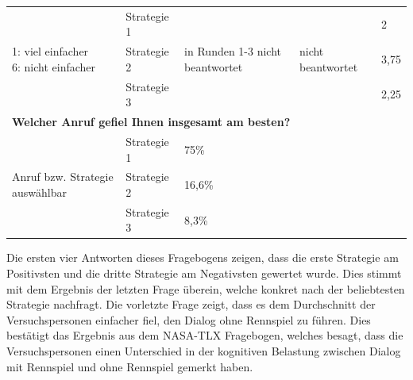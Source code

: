\documentclass[12pt,a4paper]{scrartcl}
\begin{document}
\begin{longtable}{|p{4cm}|p{2cm}|p{2cm}|p{2cm}|p{2cm}|}
\multirow{3}{4cm}{1: viel einfacher \newline  6: nicht einfacher} & Strategie 1 & \multirow{3}{2,5cm}{in Runden 1-3 nicht beantwortet} & \multirow{3}{2,5cm}{nicht beantwortet} & 2 \\
 & Strategie 2 & & & 3,75 \\
 & Strategie 3 & & & 2,25\\
\hline
		\multicolumn{5}{l}{\textbf{Welcher Anruf gefiel Ihnen insgesamt am besten?}}\\
		\hline
\multirow{3}{4cm}{Anruf bzw. Strategie auswählbar} & Strategie 1 & 75\% & & \\
 & Strategie 2 & 16,6\% && \\
 & Strategie 3 & 8,3\% && \\
\hline
\end{longtable}

Die ersten vier Antworten dieses Fragebogens zeigen, dass die erste Strategie am Positivsten und die dritte Strategie am Negativsten gewertet wurde. Dies stimmt mit dem Ergebnis der letzten Frage überein, welche konkret nach der beliebtesten Strategie nachfragt. \newline \newline Die vorletzte Frage zeigt, dass es dem Durchschnitt der Versuchspersonen einfacher fiel, den Dialog ohne Rennspiel zu führen. Dies bestätigt das Ergebnis aus dem NASA-TLX Fragebogen, welches besagt, dass die Versuchspersonen einen Unterschied in der kognitiven Belastung zwischen Dialog mit Rennspiel und ohne Rennspiel gemerkt haben.  
\end{document}
